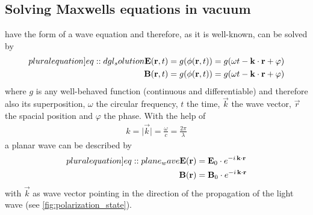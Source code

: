 \subsection{Solving Maxwells equations in vacuum}\label{sec::SolvMaxEqVac}
%
 have the form of a wave equation and therefore, as it is well-known, can be solved by
%
\begin{align}
\begin{split} \label[pluralequation]{eq::dgl_solution}
  \vec{E}( \vec{r}, t ) &= g(\phi( \vec{r}, t )) = g( \omega t - \vec{k} \cdot \vec{r} + \varphi)\\
  \vec{B}( \vec{r}, t ) &= g(\phi( \vec{r}, t )) = g( \omega t - \vec{k} \cdot \vec{r} + \varphi )
\end{split}
\end{align}
%
where $g$ is any well-behaved function (continuous and differentiable) and therefore also its superposition, $\omega$ the circular frequency, $t$ the time, $\vec{k}$ the wave vector, $\vec{r}$ the spacial position and $\varphi$ the phase.
%
With the help of
%
\begin{align}
k = \mathopen| \vec{k} \mathclose| = \frac{\omega}{c} =  \frac{2 \pi}{\lambda}
\end{align}
%
a planar wave can be described by
%
\begin{align}
\begin{split} \label[pluralequation]{eq::plane_wave}
\vec{E}(\vec{r}) &= \vec{E}_0 \cdot e^{ -i \, \vec{k} \cdot \vec{r} }\\
 \vec{B}(\vec{r}) &= \vec{B}_0 \cdot e^{ -i \, \vec{k} \cdot \vec{r} }
\end{split}
\end{align}
%
with $\vec{k}$ as wave vector pointing in the direction of the propagation of the light wave (see \cref{fig:polarization_state}).
%
%

